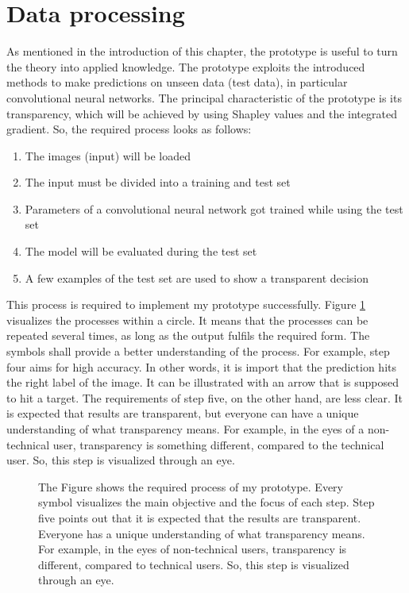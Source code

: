 \section{Data processing}

As mentioned in the introduction of this chapter, the prototype is useful to turn the theory into applied knowledge. The prototype exploits the introduced methods to make predictions on unseen data (test data), in particular convolutional neural networks. The principal characteristic of the prototype is its transparency, which will be achieved by using Shapley values and the integrated gradient. So, the required process looks as follows:

\begin{enumerate}
	\item The images (input) will be loaded
	\item The input must be divided into a training and test set
	\item Parameters of a convolutional neural network got trained while using the test set
	\item The model will be evaluated during the test set
	\item A few examples of the test set are used to show a transparent decision 
\end{enumerate}

This process is required to implement my prototype successfully. Figure \ref{fig:45_Requirements_process} visualizes the processes within a circle. It means that the processes can be repeated several times, as long as the output fulfils the required form. The symbols shall provide a better understanding of the process. For example, step four aims for high accuracy. In other words, it is import that the prediction hits the right label of the image. It can be illustrated with an arrow that is supposed to hit a target. The requirements of step five, on the other hand, are less clear. It is expected that results are transparent, but everyone can have a unique understanding of what transparency means. For example, in the eyes of a non-technical user, transparency is something different, compared to the technical user. So, this step is visualized through an eye. 

\begin{figure}[htp]
	\centering
	\caption{The Figure shows the required process of my prototype. Every symbol visualizes the main objective and the focus of each step.  Step five points out that it is expected that the results are transparent. Everyone has a unique understanding of what transparency means. For example, in the eyes of non-technical users, transparency is different, compared to technical users. So, this step is visualized through an eye. }
	\label{fig:45_Requirements_process}
\end{figure}

